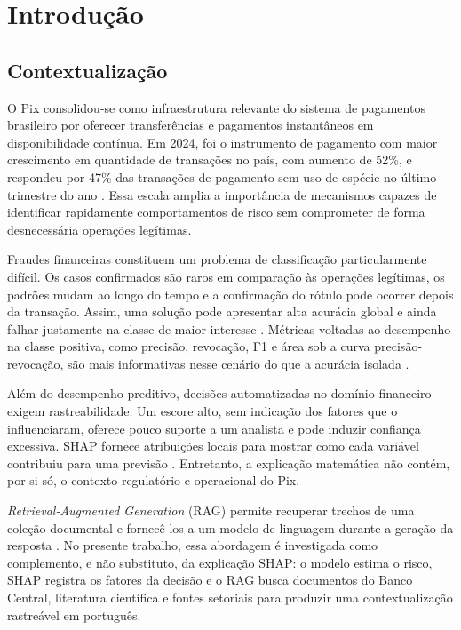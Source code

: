 \chapter{Introdução}

\section{Contextualização}

O Pix consolidou-se como infraestrutura relevante do sistema de pagamentos brasileiro por oferecer transferências e pagamentos instantâneos em disponibilidade contínua. Em 2024, foi o instrumento de pagamento com maior crescimento em quantidade de transações no país, com aumento de 52\%, e respondeu por 47\% das transações de pagamento sem uso de espécie no último trimestre do ano \cite{bcb_pagamentos_2024}. Essa escala amplia a importância de mecanismos capazes de identificar rapidamente comportamentos de risco sem comprometer de forma desnecessária operações legítimas.

Fraudes financeiras constituem um problema de classificação particularmente difícil. Os casos confirmados são raros em comparação às operações legítimas, os padrões mudam ao longo do tempo e a confirmação do rótulo pode ocorrer depois da transação. Assim, uma solução pode apresentar alta acurácia global e ainda falhar justamente na classe de maior interesse \cite{abdallah2016survey,dalpozzolo2018realistic}. Métricas voltadas ao desempenho na classe positiva, como precisão, revocação, F1 e área sob a curva precisão-revocação, são mais informativas nesse cenário do que a acurácia isolada \cite{saito2015precision}.

Além do desempenho preditivo, decisões automatizadas no domínio financeiro exigem rastreabilidade. Um escore alto, sem indicação dos fatores que o influenciaram, oferece pouco suporte a um analista e pode induzir confiança excessiva. SHAP fornece atribuições locais para mostrar como cada variável contribuiu para uma previsão \cite{lundberg2017unified}. Entretanto, a explicação matemática não contém, por si só, o contexto regulatório e operacional do Pix.

\textit{Retrieval-Augmented Generation} (RAG) permite recuperar trechos de uma coleção documental e fornecê-los a um modelo de linguagem durante a geração da resposta \cite{lewis2020rag}. No presente trabalho, essa abordagem é investigada como complemento, e não substituto, da explicação SHAP: o modelo estima o risco, SHAP registra os fatores da decisão e o RAG busca documentos do Banco Central, literatura científica e fontes setoriais para produzir uma contextualização rastreável em português.

